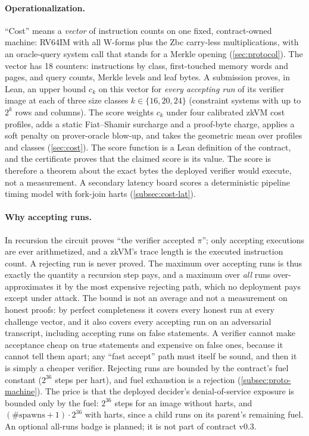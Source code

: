 \paragraph{Operationalization.} \enquote{Cost} means a \emph{vector} of instruction counts on one
fixed, contract-owned machine: RV64IM with all W-forms plus the Zbc carry-less multiplications,
with an oracle-query system call that stands for a Merkle opening (\cref{sec:protocol}). The vector
has 18 counters: instructions by class, first-touched memory words and pages, and query counts,
Merkle levels and leaf bytes. A submission proves, in Lean, an upper bound $c_k$ on this vector for
\emph{every accepting run} of its verifier image at each of three size classes
$k\in\{16,20,24\}$ (constraint systems with up to $2^k$ rows and columns). The score weights $c_k$
under four calibrated zkVM cost profiles, adds a static Fiat--Shamir surcharge and a proof-byte
charge, applies a soft penalty on prover-oracle blow-up, and takes the geometric mean over profiles
and classes (\cref{sec:cost}). The score function is a Lean definition of the contract, and the
certificate proves that the claimed score is its value. The score is therefore a theorem about the
exact bytes the deployed verifier would execute, not a measurement. A secondary latency board
scores a deterministic pipeline timing model with fork-join harts (\cref{subsec:cost-lat}).

\paragraph{Why accepting runs.} In recursion the circuit proves \enquote{the verifier accepted
$\pi$}; only accepting executions are ever arithmetized, and a zkVM's trace length is the executed
instruction count. A rejecting run is never proved. The maximum over accepting runs is thus
exactly the quantity a recursion step pays, and a maximum over \emph{all} runs over-approximates it
by the most expensive rejecting path, which no deployment pays except under attack. The bound is
not an average and not a measurement on honest proofs: by perfect completeness it covers every
honest run at every challenge vector, and it also covers every accepting run on an adversarial
transcript, including accepting runs on false statements. A verifier cannot make acceptance cheap
on true statements and expensive on false ones, because it cannot tell them apart; any
\enquote{fast accept} path must itself be sound, and then it is simply a cheaper verifier. Rejecting
runs are bounded by the contract's fuel constant ($2^{36}$ steps per hart), and fuel exhaustion is a
rejection (\cref{subsec:proto-machine}). The price is that the deployed decider's denial-of-service
exposure is bounded only by the fuel: $2^{36}$ steps for an image without harts, and
$(\#\mathrm{spawns}+1)\cdot2^{36}$ with harts, since a child runs on its parent's remaining fuel. An
optional all-runs badge is planned; it is not part of contract v0.3.

